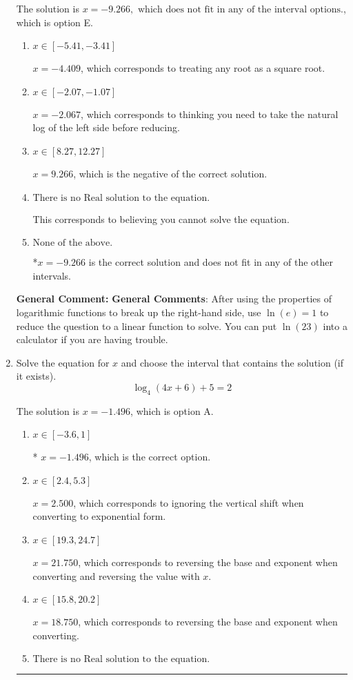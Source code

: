 \documentclass{extbook}[14pt]
\newcommand{\litem}[1]{\item #1

\rule{\textwidth}{0.4pt}}
\begin{document}
\begin{enumerate}
{The solution is \( x = -9.266, \text{ which does not fit in any of the interval options.} \), which is option E.\begin{enumerate}[label=\Alph*.]
\item \( x \in [-5.41, -3.41] \)

$x = -4.409$, which corresponds to treating any root as a square root.
\item \( x \in [-2.07, -1.07] \)

$x = -2.067$, which corresponds to thinking you need to take the natural log of the left side before reducing.
\item \( x \in [8.27, 12.27] \)

$x = 9.266$, which is the negative of the correct solution.
\item \( \text{There is no Real solution to the equation.} \)

This corresponds to believing you cannot solve the equation.
\item \( \text{None of the above.} \)

*$x = -9.266$ is the correct solution and does not fit in any of the other intervals.
\end{enumerate}

\textbf{General Comment:} \textbf{General Comments}: After using the properties of logarithmic functions to break up the right-hand side, use $\ln(e) = 1$ to reduce the question to a linear function to solve. You can put $\ln(23)$ into a calculator if you are having trouble.
}
\litem{
Solve the equation for $x$ and choose the interval that contains the solution (if it exists).
\[ \log_{4}{(4x+6)}+5 = 2 \]

The solution is \( x = -1.496 \), which is option A.\begin{enumerate}[label=\Alph*.]
\item \( x \in [-3.6, 1] \)

* $x = -1.496$, which is the correct option.
\item \( x \in [2.4, 5.3] \)

$x = 2.500$, which corresponds to ignoring the vertical shift when converting to exponential form.
\item \( x \in [19.3, 24.7] \)

$x = 21.750$, which corresponds to reversing the base and exponent when converting and reversing the value with $x$.
\item \( x \in [15.8, 20.2] \)

$x = 18.750$, which corresponds to reversing the base and exponent when converting.
\item \( \text{There is no Real solution to the equation.} \)


\end{enumerate}}
\end{enumerate}
\end{document}

